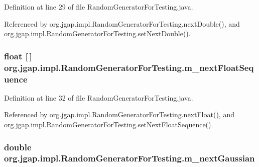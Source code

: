 Definition at line 29 of file Random\-Generator\-For\-Testing.\-java.



Referenced by org.\-jgap.\-impl.\-Random\-Generator\-For\-Testing.\-next\-Double(), and org.\-jgap.\-impl.\-Random\-Generator\-For\-Testing.\-set\-Next\-Double().

\hypertarget{classorg_1_1jgap_1_1impl_1_1_random_generator_for_testing_a8c54f5bfae3acf8e14bd18f927555edf}{
\subsubsection[{m\-\_\-next\-Float\-Sequence}]{\setlength{\rightskip}{0pt plus 5cm}float \mbox{[}$\,$\mbox{]} org.\-jgap.\-impl.\-Random\-Generator\-For\-Testing.\-m\-\_\-next\-Float\-Sequence\hspace{0.3cm}{\ttfamily [private]}}}\label{classorg_1_1jgap_1_1impl_1_1_random_generator_for_testing_a8c54f5bfae3acf8e14bd18f927555edf}


Definition at line 32 of file Random\-Generator\-For\-Testing.\-java.



Referenced by org.\-jgap.\-impl.\-Random\-Generator\-For\-Testing.\-next\-Float(), and org.\-jgap.\-impl.\-Random\-Generator\-For\-Testing.\-set\-Next\-Float\-Sequence().

\hypertarget{classorg_1_1jgap_1_1impl_1_1_random_generator_for_testing_af40fc81119968c042f9ea5b605f4e558}{
\subsubsection[{m\-\_\-next\-Gaussian}]{\setlength{\rightskip}{0pt plus 5cm}double org.\-jgap.\-impl.\-Random\-Generator\-For\-Testing.\-m\-\_\-next\-Gaussian\hspace{0.3cm}{\ttfamily [private]}}}\label{classorg_1_1jgap_1_1impl_1_1_random_generator_for_testing_af40fc81119968c042f9ea5b605f4e558}



